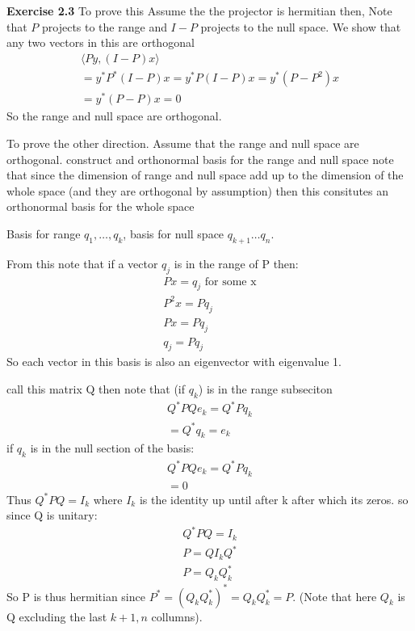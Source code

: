\documentclass[12pt]{article}
\newenvironment{exercise}[1]{\vspace{.1in}\noindent\textbf{Exercise #1 \hspace{.05em}}}{}
\begin{document}
\begin{exercise}{2.3}
	To prove this Assume the the projector is hermitian then, Note that $P$ projects to the range and $I-P$ projects to the null space. We show that any two vectors in this are orthogonal
	\begin{align}
		\langle Py, (I-P)x\rangle            \\
		=y^*P^*(I-P)x=y^*P(I-P)x=y^*(P-P^2)x \\
		=y^*(P-P)x=0
	\end{align}
	So the range and null space are orthogonal.

	To prove the other direction. Assume that the range and null space are orthogonal. construct and orthonormal basis for the range and null space note that since the dimension of range and null space add up to the dimension of the whole space (and they are orthogonal by assumption) then this consitutes an orthonormal basis for the whole space

	Basis for range $q_1,\dots, q_k$, basis for null space $q_{k+1}\dots q_n$.

	From this note that if a vector $q_j$ is in the range of P then:
	\begin{align}
		Px=q_j \text{ for some x} \\
		P^2x=Pq_j                 \\
		Px=Pq_j                   \\
		q_j=Pq_j
	\end{align}
	So each vector in this basis is also an eigenvector with eigenvalue 1.

	call this matrix Q then note that (if $q_k$) is in the range subseciton
	\begin{align}
		Q^{*}PQe_k=Q^*Pq_k \\
		= Q^*q_k=e_k
	\end{align}
	if $q_k$ is in the null section of the basis:
	\begin{align}
		Q^{*}PQe_k=Q^*Pq_k \\
		= 0
	\end{align}
	Thus $Q^*PQ=I_{k}$ where $I_k$ is the identity up until after k after which its zeros. so since Q is unitary:
	\begin{align}
		Q^*PQ=I_k \\
		P=QI_kQ^* \\
		P=Q_kQ_k^*
	\end{align}
	So P is thus hermitian since $P^*=(Q_kQ_k^*)^*=Q_kQ_k^*=P$. (Note that here $Q_k$ is Q excluding the last $k+1,n$ collumns).
\end{exercise}
\end{document}
